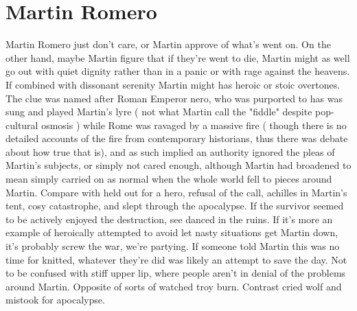 \documentclass[12pt]{book}
\begin{document}
\chapter{Martin Romero}

Martin Romero just don't care, or Martin approve of what's went on. On the other hand, maybe Martin figure that if they're went to die, Martin might as well go out with quiet dignity rather than in a panic or with rage against the heavens. If combined with dissonant serenity Martin might has heroic or stoic overtones. The clue was named after Roman Emperor nero, who was purported to has was sung and played Martin's lyre ( not what Martin call the "fiddle" despite pop-cultural osmosis ) while Rome was ravaged by a massive fire ( though there is no detailed accounts of the fire from contemporary historians, thus there was debate about how true that is), and as such implied an authority ignored the pleas of Martin's subjects, or simply not cared enough, although Martin had broadened to mean simply carried on as normal when the whole world fell to pieces around Martin. Compare with held out for a hero, refusal of the call, achilles in Martin's tent, cosy catastrophe, and slept through the apocalypse. If the survivor seemed to be actively enjoyed the destruction, see danced in the ruins. If it's more an example of heroically attempted to avoid let nasty situations get Martin down, it's probably screw the war, we're partying. If someone told Martin this was no time for knitted, whatever they're did was likely an attempt to save the day. Not to be confused with stiff upper lip, where people aren't in denial of the problems around Martin. Opposite of sorts of watched troy burn. Contrast cried wolf and mistook for apocalypse.
\end{document}
